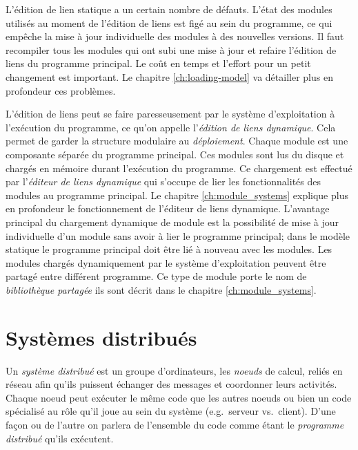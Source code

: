 L'édition de lien statique a un certain nombre de défauts. L'état des
modules utilisés au moment de l'édition de liens est figé au sein du
programme, ce qui empêche la mise à jour individuelle des modules à des nouvelles versions. Il faut
recompiler tous les modules qui ont subi une mise à jour et refaire l'édition de liens du
programme principal. Le coût en temps et l'effort pour un petit changement
est important.  Le chapitre \ref{ch:loading-model} va détailler plus en profondeur
ces problèmes.

L'édition de liens peut se faire paresseusement par le système d'exploitation à
l'exécution du programme, ce qu'on appelle l'\textit{édition de liens dynamique}.  Cela
permet de garder la structure modulaire au \textit{déploiement}.
Chaque module est une composante séparée du programme principal.  Ces modules
sont lus du disque et chargés en mémoire durant l'exécution du programme.  Ce
chargement est effectué par l'\textit{éditeur de liens dynamique} qui s'occupe de
lier les fonctionnalités des modules au programme principal. Le chapitre %
\ref{ch:module_systems} explique plus en profondeur le fonctionnement de l'éditeur de liens
dynamique. L'avantage principal du chargement dynamique de module est la possibilité de mise à jour
individuelle d'un module sans avoir à lier le programme principal; dans le
modèle statique le programme principal doit être lié à nouveau avec les modules.
Les modules chargés dynamiquement par le système d'exploitation peuvent être partagé entre différent
programme. Ce type de module porte le nom de \textit{bibliothèque partagée} ils sont décrit dans
le chapitre \ref{ch:module_systems}.

\section{Systèmes distribués}


Un \textit{système distribué} est un groupe d'ordinateurs, les
\textit{noeuds} de calcul, reliés en réseau afin qu'ils puissent
échanger des messages et coordonner leurs activités.  Chaque noeud peut
exécuter le même code que les autres noeuds ou bien un code spécialisé
au rôle qu'il joue au sein du système (e.g.~serveur vs.~client).
D'une façon ou de l'autre on parlera de l'ensemble du code comme étant
le \textit{programme distribué} qu'ils exécutent.

